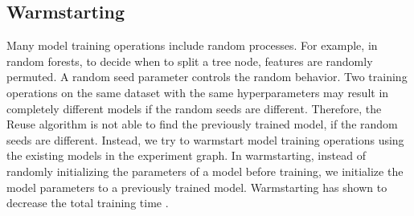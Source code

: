\subsection{Warmstarting}
Many model training operations include random processes.
For example, in random forests, to decide when to split a tree node, features are randomly permuted.
A random seed parameter controls the random behavior.
Two training operations on the same dataset with the same hyperparameters may result in completely different models if the random seeds are different.
Therefore, the Reuse algorithm is not able to find the previously trained model, if the random seeds are different.
Instead, we try to warmstart model training operations using the existing models in the experiment graph.
In warmstarting, instead of randomly initializing the parameters of a model before training, we initialize the model parameters to a previously trained model.
Warmstarting has shown to decrease the total training time \cite{baylor2017tfx}.

